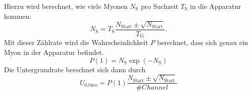 Hierzu wird berechnet, wie viele Myonen $N_{\text{S}}$ pro Suchzeit $T_{\text{S}}$ in die Apparatur kommen:
\begin{equation*}
  N_{\text{S}}= T_{\text{S}}\frac{N_{\text{Start}} \pm \sqrt{ N_{\text{Start}}} }{T_{\text{G}}}.
\end{equation*}
Mit dieser Zählrate wird die Wahrscheinlichkeit $P$ berechnet, dass sich genau ein Myon in der Apparatur befindet.
\begin{equation*}
  P(1)= N_{\text{S}} \exp{(-N_{\text{S}})}
\end{equation*}
Die Untergrundrate berechnet sich dann durch
\begin{equation*}
  U_{\text{0,theo}}= P(1) \frac{ N_{\text{Start}} \pm \sqrt{ N_{\text{Start}} }}{\# Channel}
\end{equation*}
\FloatBarrier
